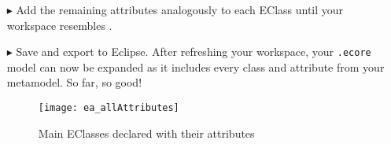 \begin{itemize}
\vspace{0.5cm}

\item[$\blacktriangleright$] Add the remaining attributes analogously to each EClass until your workspace resembles .

\vspace{0.5cm}

\item[$\blacktriangleright$] Save and export to Eclipse. After refreshing your workspace, your \texttt{.ecore} model can now be expanded as it includes
every class and attribute from your metamodel. So far, so good!

\newpage

\vspace*{3cm}

\begin{figure}[htbp]
	\centering
  \texttt{[image: ea\_allAttributes]}
	\caption{Main EClasses declared with their attributes}
	\label{ea:attribute_completed}
\end{figure}
\FloatBarrier

\end{itemize}
